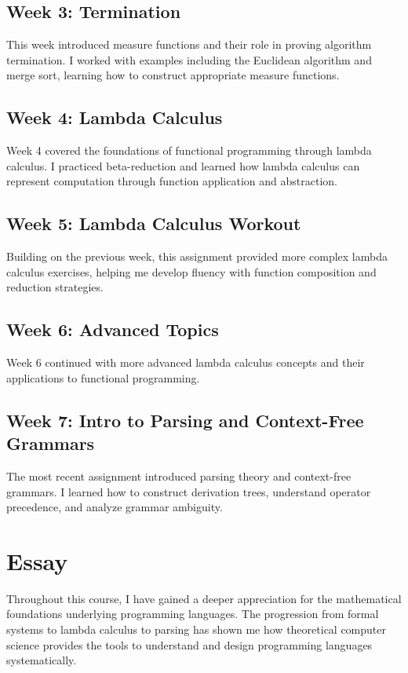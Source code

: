 \documentclass{article}
\theoremstyle{plain}
\theoremstyle{definition}
\theoremstyle{remark}
\begin{document}
\subsection{Week 3: Termination}

This week introduced measure functions and their role in proving algorithm termination. I worked with examples including the Euclidean algorithm and merge sort, learning how to construct appropriate measure functions.

\subsection{Week 4: Lambda Calculus}

Week 4 covered the foundations of functional programming through lambda calculus. I practiced beta-reduction and learned how lambda calculus can represent computation through function application and abstraction.

\subsection{Week 5: Lambda Calculus Workout}

Building on the previous week, this assignment provided more complex lambda calculus exercises, helping me develop fluency with function composition and reduction strategies.

\subsection{Week 6: Advanced Topics}

Week 6 continued with more advanced lambda calculus concepts and their applications to functional programming.

\subsection{Week 7: Intro to Parsing and Context-Free Grammars}

The most recent assignment introduced parsing theory and context-free grammars. I learned how to construct derivation trees, understand operator precedence, and analyze grammar ambiguity.

\section{Essay}

Throughout this course, I have gained a deeper appreciation for the mathematical foundations underlying programming languages. The progression from formal systems to lambda calculus to parsing has shown me how theoretical computer science provides the tools to understand and design programming languages systematically.
\end{document}
